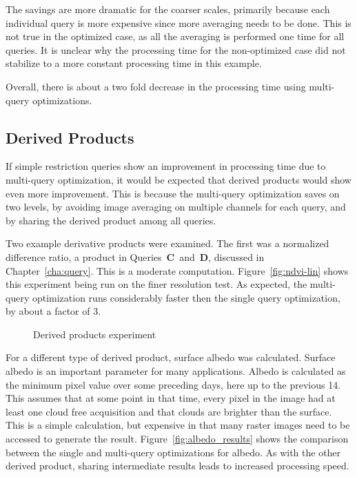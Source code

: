 \documentclass{ucdthesis}       %
\newcommand{\qry}[1]{{\bf #1}}
\begin{document}
The savings are more dramatic for the coarser scales, primarily
because each individual query is more expensive since more averaging
needs to be done.  This is not true in the optimized case, as all the
averaging is performed one time for all queries.  It is unclear why the
processing time for the non-optimized case did not stabilize to a more
constant processing time in this example.

Overall, there is about a two fold decrease in the processing time
using multi-query optimizations.  

\subsection{Derived Products}
\label{sec:derived}

If simple restriction queries show an improvement in processing time
due to multi-query optimization, it would be expected that derived
products would show even more improvement.  This is because the
multi-query optimization saves on two levels, by avoiding image
averaging on multiple channels for each query, and by sharing the
derived product among all queries.

Two example derivative products were examined.  The first was a
normalized difference ratio, a product in Queries~\qry{C}~and~\qry{D},
discussed in Chapter~\ref{cha:query}.  This is a moderate computation.
Figure~\ref{fig:ndvi-lin} shows this experiment being run on the finer
resolution test.  As expected, the multi-query optimization runs
considerably faster then the single query optimization, by about a
factor of 3.

\begin{figure}[htb]
  \centering
  \caption{Derived products experiment}
\end{figure}

For a different type of derived product, surface albedo was
calculated.  Surface albedo is an important parameter for many
applications.  Albedo is calculated as the minimum pixel value over
some preceding days, here up to the previous 14.  This assumes that at
some point in that time, every pixel in the image had at least one
cloud free acquisition and that clouds are brighter than the surface.
This is a simple calculation, but expensive in that many raster images
need to be accessed to generate the result.
Figure~\ref{fig:albedo_results} shows the comparison between the
single and multi-query optimizations for albedo.  As with the other
derived product, sharing intermediate results leads to increased
processing speed.
\end{document}
